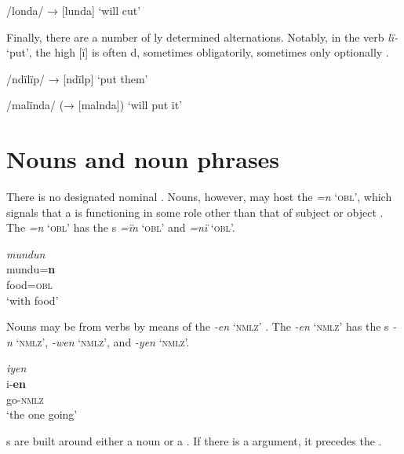     \ex  /londa/      → [lunda]      ‘will cut’
    \z
\z

Finally, there are a number of ly determined  alternations. Notably, in the verb \textit{lï-} ‘put’, the  high  [ï] is often d, sometimes obligatorily, sometimes only optionally .


\ea%
    \label{ex:overview:13}
    \ea  /ndïlïp/      → [ndïlp]      ‘put them’

    \ex  /malïnda/    (→ [malnda])    ‘will put it’
    \z
\z

\section{Nouns and noun phrases}\label{sec:overview:2.3}


There is no designated nominal . Nouns, however, may host the   \textit{=n} ‘\textsc{obl}’, which signals that a  is functioning in some role other than that of subject or object . The   \textit{=n} ‘\textsc{obl}’ has the s \textit{=ïn} ‘\textsc{obl}’ and \textit{=nï} ‘\textsc{obl}’.

\ea%
    \label{ex:overview:14}
    \textit{mundun}\\
\gll    mundu=\textbf{n}\\
    food=\textsc{obl}      \\
\glt    ‘with food’
\z

Nouns may be  from verbs by means of the   \textit{{}-en} ‘\textsc{nmlz’} . The   \textit{{}-en} ‘\textsc{nmlz’} has the s \textit{{}-n} ‘\textsc{nmlz}’, \textit{{}-wen} ‘\textsc{nmlz’}, and \textit{{}-yen} ‘\textsc{nmlz’.}

\ea%
    \label{ex:overview:15}
    \textit{iyen}\\
\gll    i-\textbf{en}\\
    go-\textsc{nmlz}\\
\glt    ‘the one going’
\z

  s are built around either a noun or a . If there is a  argument, it precedes the  .

